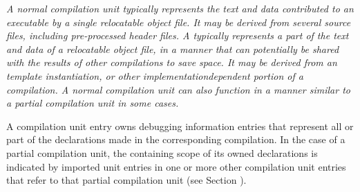 \textit{A normal compilation unit typically represents the text and
data contributed to an executable by a single relocatable
object file. It may be derived from several source files,
including pre-processed header files. 
A  typically represents a part of the text
and data of a relocatable object file, in a manner that can
potentially be shared with the results of other compilations
to save space. It may be derived from an 
template instantiation, or other implementation\dash dependent
portion of a compilation. A normal compilation unit can also
function in a manner similar to a partial compilation unit
in some cases.}

A compilation unit entry owns debugging information
entries that represent all or part of the declarations
made in the corresponding compilation. In the case of a
partial compilation unit, the containing scope of its owned
declarations is indicated by imported unit entries in one
or more other compilation unit entries that refer to that
partial compilation unit (see 
Section ).


